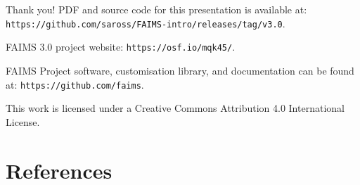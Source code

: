 \documentclass[aspectratio=169, 12pt]{beamer} %
\begin{document}
\begin{frame}{Thank you!}
PDF and source code for this presentation is available at: 
\texttt{https://github.com/saross/FAIMS-intro/releases/tag/v3.0}.

FAIMS 3.0 project website: \texttt{https://osf.io/mqk45/}.

FAIMS Project software, customisation library, and documentation can be found at:
\texttt{https://github.com/faims}.


This work is licensed under a Creative Commons Attribution 4.0 International License.

\end{frame}


\section{References}


  
%   
%   

\begin{multicols}{2}[]



\end{multicols}





    
\end{document}
